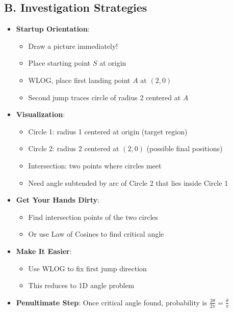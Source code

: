\documentclass[12pt]{article}
\begin{document}
\begin{strategicbox}
\subsection*{B. Investigation Strategies}
\begin{itemize}[leftmargin=*]
    \item \textbf{Startup Orientation}: 
    \begin{itemize}
        \item Draw a picture immediately!
        \item Place starting point $S$ at origin
        \item WLOG, place first landing point $A$ at $(2, 0)$
        \item Second jump traces circle of radius 2 centered at $A$
    \end{itemize}
    \item \textbf{Visualization}: 
    \begin{itemize}
        \item Circle 1: radius 1 centered at origin (target region)
        \item Circle 2: radius 2 centered at $(2, 0)$ (possible final positions)
        \item Intersection: two points where circles meet
        \item Need angle subtended by arc of Circle 2 that lies inside Circle 1
    \end{itemize}
    \item \textbf{Get Your Hands Dirty}: 
    \begin{itemize}
        \item Find intersection points of the two circles
        \item Or use Law of Cosines to find critical angle
    \end{itemize}
    \item \textbf{Make It Easier}: 
    \begin{itemize}
        \item Use WLOG to fix first jump direction
        \item This reduces to 1D angle problem
    \end{itemize}
    \item \textbf{Penultimate Step}: Once critical angle found, probability is $\frac{2\theta}{2\pi} = \frac{\theta}{\pi}$
\end{itemize}


\end{strategicbox}
\end{document}
